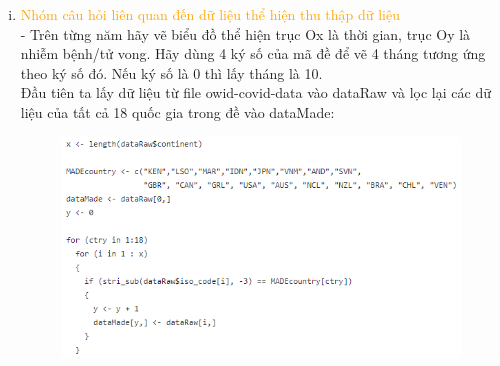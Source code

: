 \documentclass[a4paper]{article}
\theoremstyle{definition}
\begin{document}
\begin{enumerate}[i)]
\begin{enumerate}[1)]
\begin{figure}[H]
			\end{figure}
		\end{enumerate}
		\item \textcolor{orange}{Nhóm câu hỏi liên quan đến dữ liệu thể hiện thu thập dữ liệu}\\
		- Trên từng năm hãy vẽ biểu đồ thể hiện trục Ox là thời gian, trục Oy là nhiễm bệnh/tử vong. Hãy dùng 4 ký số của mã đề để vẽ 4 tháng tương ứng theo ký số đó. Nếu ký số là 0 thì lấy tháng là 10.\\
		
		Đầu tiên ta lấy dữ liệu từ file owid-covid-data vào dataRaw và lọc lại các dữ liệu của tất cả 18 quốc gia trong đề vào dataMade:
        \begin{figure}[H]
			\centering
			\includegraphics{images/7.0.png}
		\end{figure}
		

\end{enumerate}
\end{document}
